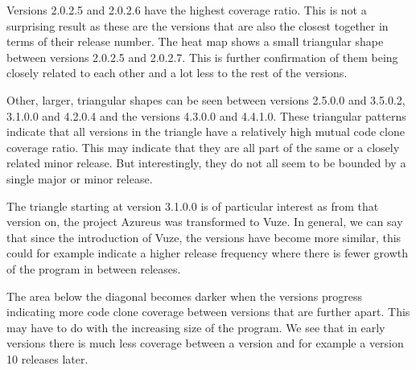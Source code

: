 \documentclass[a4paper,twoside, twocolumn, 11pt]{article}
\numberwithin{equation}{section}
\begin{document}
Versions 2.0.2.5 and 2.0.2.6 have the highest coverage ratio.
This is not a surprising result as these are the versions that are also the closest together in terms of their release number. 
The heat map shows a small triangular shape between versions 2.0.2.5 and 2.0.2.7. 
This is further confirmation of them being closely related to each other and a lot less to the rest of the versions.

Other, larger, triangular shapes can be seen between versions 2.5.0.0 and 3.5.0.2, 3.1.0.0 and 4.2.0.4 and the versions 4.3.0.0 and 4.4.1.0.
These triangular patterns indicate that all versions in the triangle have a relatively high mutual code clone coverage ratio.
This may indicate that they are all part of the same or a closely related minor release.
But interestingly, they do not all seem to be bounded by a single major or minor release.

The triangle starting at version 3.1.0.0 is of particular interest as from that version on, the project Azureus was transformed to Vuze.
In general, we can say that since the introduction of Vuze, the versions have become more similar, this could for example indicate a higher release frequency where there is fewer growth of the program in between releases.

The area below the diagonal becomes darker when the versions progress indicating more code clone coverage between versions that are further apart.
This may have to do with the increasing size of the program. 
We see that in early versions there is much less coverage between a version and for example a version 10 releases later.
\end{document}
